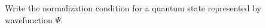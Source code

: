 

\vspace*{\fill}
\centering

Write the normalization condition for a quantum state represented by wavefunction $\Psi$.

\centering
\vspace*{\fill}

